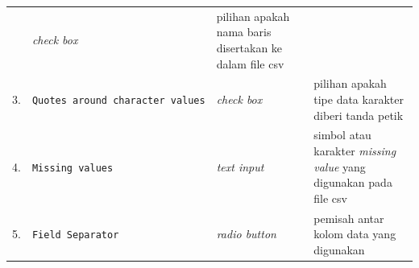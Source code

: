 \documentclass[12pt,]{krantz}
\begin{document}
\begin{longtable}[]{@{}llll@{}}
\begin{minipage}[t]{0.23\columnwidth}
\end{minipage} & \begin{minipage}[t]{0.10\columnwidth}\raggedright
\emph{check box}\strut
\end{minipage} & \begin{minipage}[t]{0.51\columnwidth}\raggedright
pilihan apakah nama baris disertakan ke dalam file csv\strut
\end{minipage}\tabularnewline
\begin{minipage}[t]{0.05\columnwidth}\raggedright
3.\strut
\end{minipage} & \begin{minipage}[t]{0.23\columnwidth}\raggedright
\texttt{Quotes\ around\ character\ values}\strut
\end{minipage} & \begin{minipage}[t]{0.10\columnwidth}\raggedright
\emph{check box}\strut
\end{minipage} & \begin{minipage}[t]{0.51\columnwidth}\raggedright
pilihan apakah tipe data karakter diberi tanda petik\strut
\end{minipage}\tabularnewline
\begin{minipage}[t]{0.05\columnwidth}\raggedright
4.\strut
\end{minipage} & \begin{minipage}[t]{0.23\columnwidth}\raggedright
\texttt{Missing\ values}\strut
\end{minipage} & \begin{minipage}[t]{0.10\columnwidth}\raggedright
\emph{text input}\strut
\end{minipage} & \begin{minipage}[t]{0.51\columnwidth}\raggedright
simbol atau karakter \emph{missing value} yang digunakan pada file csv\strut
\end{minipage}\tabularnewline
\begin{minipage}[t]{0.05\columnwidth}\raggedright
5.\strut
\end{minipage} & \begin{minipage}[t]{0.23\columnwidth}\raggedright
\texttt{Field\ Separator}\strut
\end{minipage} & \begin{minipage}[t]{0.10\columnwidth}\raggedright
\emph{radio button}\strut
\end{minipage} & \begin{minipage}[t]{0.51\columnwidth}\raggedright
pemisah antar kolom data yang digunakan\strut
\end{minipage}\tabularnewline
\bottomrule
\end{longtable}
\end{document}
